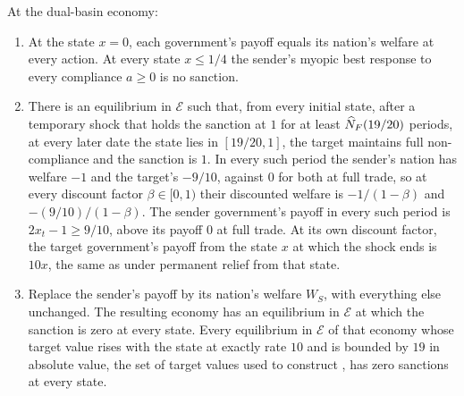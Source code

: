 \begin{proposition}
\label{prop:entrenchment-welfare}
At the dual-basin economy:
\begin{enumerate}[label=(\roman*)]
\item At the state $x=0$, each government's payoff equals its nation's welfare
at every action. At every state $x\le1/4$ the sender's myopic best response to
every compliance $a\ge0$ is no sanction.
\item There is an equilibrium in $\mathcal E$ such that, from every initial
state, after a temporary shock that holds the sanction at $1$ for at least
$\widehat N_{F}(19/20)$ periods, at every later date the state lies in
$[19/20,1]$, the target maintains full non-compliance and the sanction is $1$. In every such
period the sender's nation has welfare $-1$ and the target's $-9/10$, against
$0$ for both at full trade, so at every discount factor $\beta\in[0,1)$ their
discounted welfare is $-1/(1-\beta)$ and $-(9/10)/(1-\beta)$. The sender
government's payoff in every such period is $2x_t-1\ge 9/10$, above its payoff
$0$ at full trade. At its own discount factor, the target government's payoff
from the state $x$ at which the shock ends is $10x$, the same as under
permanent relief from that state.
\item Replace the sender's payoff by its nation's welfare $W_S$, with everything
else unchanged. The resulting economy has an equilibrium in $\mathcal E$ at
which the sanction is zero at every state. Every equilibrium in $\mathcal E$ of
that economy whose target value rises with the state at exactly rate $10$ and
is bounded by $19$ in absolute value, the set of target values used to
construct , has zero sanctions at every
state.
\end{enumerate}
\end{proposition}

